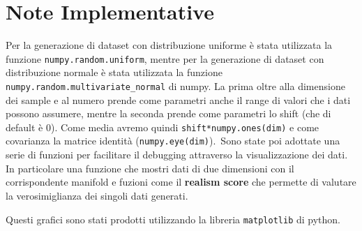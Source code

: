 \chapter{Note Implementative}\label{ch:notes}

Per la generazione di dataset con distribuzione uniforme è stata utilizzata la funzione \texttt{numpy.random.uniform}, mentre per la generazione di dataset con distribuzione normale è stata utilizzata la funzione \texttt{numpy.random.multivariate\_normal} di numpy. La prima oltre alla dimensione dei sample e al numero prende come parametri anche il range di valori che i dati possono assumere, mentre la seconda prende come parametri lo shift (che di default è 0). Come media avremo quindi \texttt{shift*numpy.ones(dim)} e come covarianza la matrice identità (\texttt{numpy.eye(dim)}).\
Sono state poi adottate una serie di funzioni per facilitare il debugging attraverso la visualizzazione dei dati. In particolare una funzione che mostri dati di due dimensioni con il corrispondente manifold e fuzioni come il \textbf{realism score} che permette di valutare la verosimiglianza dei singoli dati generati.\

Questi grafici sono stati prodotti utilizzando la libreria \texttt{matplotlib} di python.